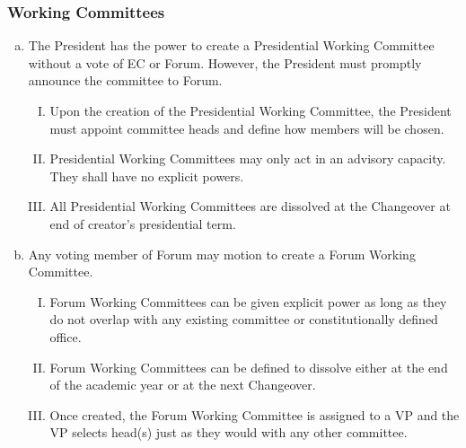 \documentclass[USletter,12pt]{article}
\begin{document}
\subsubsection{Working Committees}
\begin{enumerate}[(a)]
\item The President has the power to create a Presidential Working Committee without a vote of EC or Forum.  However, the President must promptly announce the committee to Forum.
	\begin{enumerate}[(I)]
	\item Upon the creation of the Presidential Working Committee, the President must appoint committee heads and define how members will be chosen.
	\item Presidential Working Committees may only act in an advisory capacity.  They shall have no explicit powers.
	\item All Presidential Working Committees are dissolved at the Changeover at end of creator's presidential term.
	\end{enumerate}
\item Any voting member of Forum may motion to create a Forum Working Committee.
	\begin{enumerate}[(I)]
	\item Forum Working Committees can be given explicit power as long as they do not overlap with any existing committee or constitutionally defined office.
	\item Forum Working Committees can be defined to dissolve either at the end of the academic year or at the next Changeover.
	\item Once created, the Forum Working Committee is assigned to a VP and the VP selects head(s) just as they would with any other committee.
	\end{enumerate}
\end{enumerate}
\end{document}
